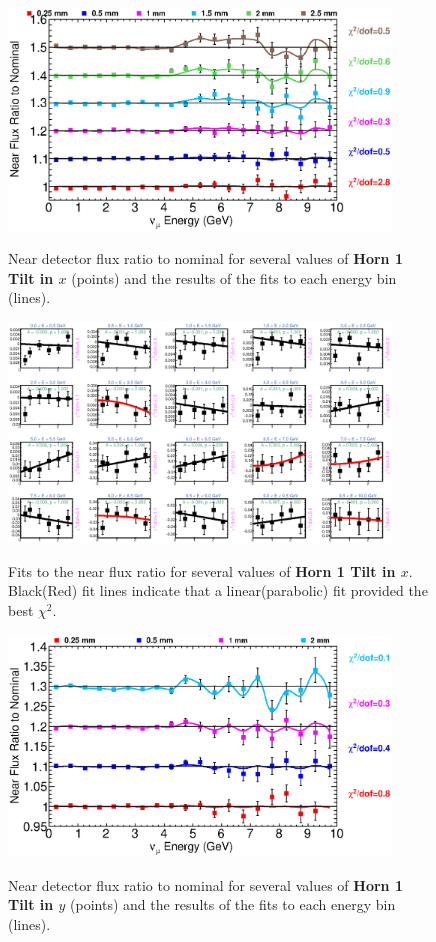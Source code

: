 \begin{figure}[ht]
  \begin{center}
    {\includegraphics[width=4.0in]{figures/Horn1XTilt_near_summary.eps}}
  \end{center}
\caption{ Near detector flux ratio to nominal for several values of {\bf Horn 1 Tilt in $x$} (points) and the results of the fits to each energy bin (lines).}
\end{figure}

\begin{figure}[hb]
  \begin{center}
    {\includegraphics[width=4.0in]{figures/Horn1XTilt_near_fits.eps}}
  \end{center}
\caption{ Fits to the near flux ratio for several values of {\bf Horn 1 Tilt in $x$}. Black(Red) fit lines indicate that a linear(parabolic) fit provided the best $\chi^2$. }
\end{figure}

\begin{figure}[ht]
  \begin{center}
    {\includegraphics[width=4.0in]{figures/Horn1YTilt_near_summary.eps}}
  \end{center}
\caption{ Near detector flux ratio to nominal for several values of {\bf Horn 1 Tilt in $y$} (points) and the results of the fits to each energy bin (lines).}
\end{figure}


